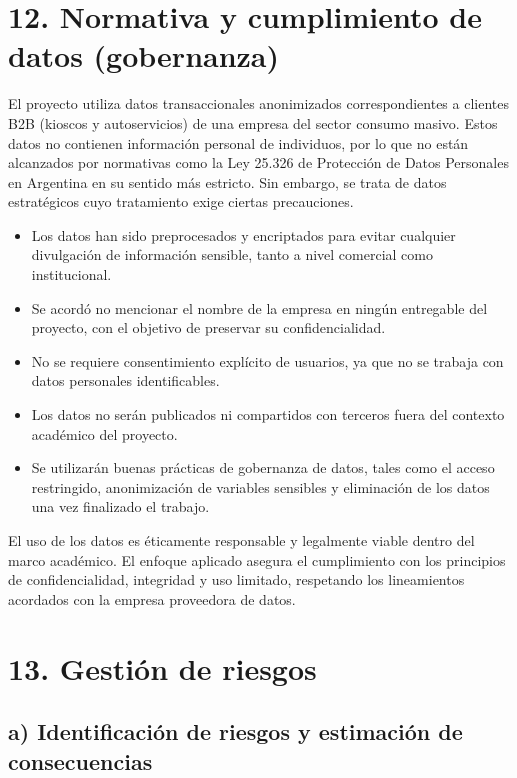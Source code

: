 \documentclass[
11pt, %
]{charter}
\begin{document}
\begin{longtable}{|p{1.3cm}|p{1.3cm}|>{\raggedright\arraybackslash}p{6.5cm}|p{1cm}|>{\raggedright\arraybackslash}p{3.5cm}|p{1cm}|}
\end{longtable}

\section{12. Normativa y cumplimiento de datos (gobernanza)}

El proyecto utiliza datos transaccionales anonimizados correspondientes a clientes B2B (kioscos y autoservicios) de una empresa del sector consumo masivo. Estos datos no contienen información personal de individuos, por lo que no están alcanzados por normativas como la Ley 25.326 de Protección de Datos Personales en Argentina en su sentido más estricto. Sin embargo, se trata de datos estratégicos cuyo tratamiento exige ciertas precauciones.

\begin{itemize}
\item Los datos han sido preprocesados y encriptados para evitar cualquier divulgación de información sensible, tanto a nivel comercial como institucional.
\item Se acordó no mencionar el nombre de la empresa en ningún entregable del proyecto, con el objetivo de preservar su confidencialidad.
\item No se requiere consentimiento explícito de usuarios, ya que no se trabaja con datos personales identificables.
\item Los datos no serán publicados ni compartidos con terceros fuera del contexto académico del proyecto.
\item Se utilizarán buenas prácticas de gobernanza de datos, tales como el acceso restringido, anonimización de variables sensibles y eliminación de los datos una vez finalizado el trabajo.
\end{itemize}

El uso de los datos es éticamente responsable y legalmente viable dentro del marco académico. El enfoque aplicado asegura el cumplimiento con los principios de confidencialidad, integridad y uso limitado, respetando los lineamientos acordados con la empresa proveedora de datos.

\section{13. Gestión de riesgos}
\label{sec:riesgos}

\subsection*{a) Identificación de riesgos y estimación de consecuencias}
\end{document}
